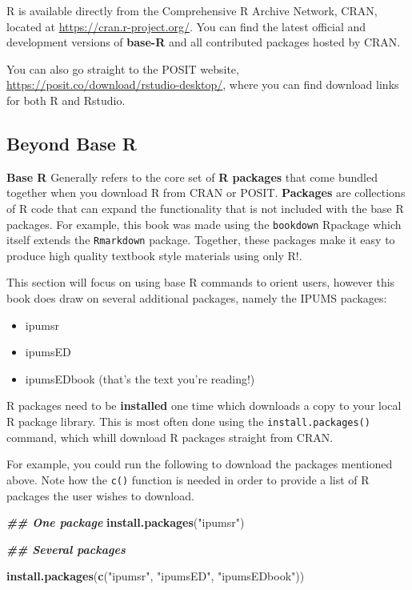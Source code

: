 \documentclass[
]{book}
\newenvironment{Shaded}{\begin{snugshade}}{\end{snugshade}}
\newcommand{\DocumentationTok}[1]{\textcolor[rgb]{0.56,0.35,0.01}{\textbf{\textit{#1}}}}
\newcommand{\FunctionTok}[1]{\textcolor[rgb]{0.13,0.29,0.53}{\textbf{#1}}}
\newcommand{\NormalTok}[1]{#1}
\newcommand{\StringTok}[1]{\textcolor[rgb]{0.31,0.60,0.02}{#1}}
\providecommand{\tightlist}{%
  \setlength{\itemsep}{0pt}\setlength{\parskip}{0pt}}
\begin{document}
R is available directly from the Comprehensive R Archive Network, CRAN, located at \url{https://cran.r-project.org/}. You can find the latest official and development versions of \textbf{base-R} and all contributed packages hosted by CRAN.

You can also go straight to the POSIT website, \url{https://posit.co/download/rstudio-desktop/}, where you can find download links for both R and Rstudio.

\hypertarget{beyond-base-r}{%
\subsection*{Beyond Base R}\label{beyond-base-r}}

\textbf{Base R} Generally refers to the core set of \textbf{R packages} that come bundled together when you download R from CRAN or POSIT. \textbf{Packages} are collections of R code that can expand the functionality that is not included with the base R packages. For example, this book was made using the \texttt{bookdown} Rpackage which itself extends the \texttt{Rmarkdown} package. Together, these packages make it easy to produce high quality textbook style materials using only R!.

This section will focus on using base R commands to orient users, however this book does draw on several additional packages, namely the IPUMS packages:

\begin{itemize}
\tightlist
\item
  ipumsr
\item
  ipumsED
\item
  ipumsEDbook (that's the text you're reading!)
\end{itemize}

R packages need to be \textbf{installed} one time which downloads a copy to your local R package library. This is most often done using the \texttt{install.packages()} command, which whill download R packages straight from CRAN.

For example, you could run the following to download the packages mentioned above. Note how the \texttt{c()} function is needed in order to provide a list of R packages the user wishes to download.

\begin{Shaded}
\begin{Highlighting}[]
\DocumentationTok{\#\# One package}
\FunctionTok{install.packages}\NormalTok{(}\StringTok{"ipumsr"}\NormalTok{)}


\DocumentationTok{\#\# Several packages}

\FunctionTok{install.packages}\NormalTok{(}\FunctionTok{c}\NormalTok{(}\StringTok{"ipumsr"}\NormalTok{, }\StringTok{"ipumsED"}\NormalTok{, }\StringTok{"ipumsEDbook"}\NormalTok{))}
\end{Highlighting}
\end{Shaded}
\end{document}
